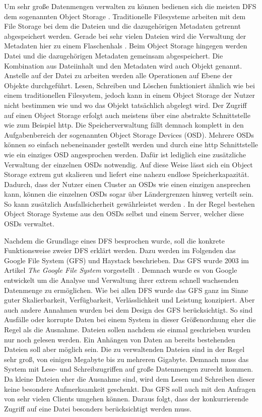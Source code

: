 \documentclass[12pt,oneside,a4paper,parskip]{scrbook}
\begin{document}
Um sehr große Datenmengen verwalten zu können bedienen sich die meisten DFS dem sogenannten Object Storage \cite{cephPaper}. Traditionelle Filesysteme arbeiten mit dem File Storage bei dem die Dateien und die dazugehörigen Metadaten getrennt abgespeichert werden. Gerade bei sehr vielen Dateien wird die Verwaltung der Metadaten hier zu einem Flaschenhals \cite{filestorage}. Beim Object Storage hingegen werden Datei und die dazugehörigen Metadaten gemeinsam abgespeichert. Die Kombination aus Dateiinhalt und den Metadaten wird auch Objekt genannt. Anstelle auf der Datei zu arbeiten werden alle Operationen auf Ebene der Objekte durchgeführt. Lesen, Schreiben und Löschen funktioniert ähnlich wie bei einem traditionellen Filesystem, jedoch kann in einem Object Storage der Nutzer nicht bestimmen wie und wo das Objekt tatsächlich abgelegt wird. Der Zugriff auf einen Object Storage erfolgt auch meistens über eine abstrakte Schnittstelle wie zum Beispiel http. Die Speicherverwaltung fällt demnach komplett in den Aufgabenbereich der sogenannten Object Storage Devices (OSD). Mehrere OSDs können so einfach nebeneinander gestellt werden und durch eine http Schnittstelle wie ein einziges OSD angesprochen werden. Dafür ist lediglich eine zusätzliche Verwaltung der einzelnen OSDs notwendig. Auf diese Weise lässt sich ein Object Storage extrem gut skalieren und liefert eine nahezu endlose Speicherkapazität. Dadurch, dass der Nutzer einen Cluster an OSDs wie einen einzigen ansprechen kann, können die einzelnen OSDs sogar über Ländergrenzen hinweg verteilt sein. So kann zusätzlich Ausfallsicherheit gewährleistet werden \cite{osvideo}\cite{objectstorage}. In der Regel bestehen Object Storage Systeme aus den OSDs selbst und einem Server, welcher diese OSDs verwaltet.

Nachdem die Grundlage eines DFS besprochen wurde, soll die konkrete Funktionsweise zweier DFS erklärt werden. Dazu werden im Folgenden das Google File System (GFS) und Haystack beschrieben.
Das GFS wurde 2003 im Artikel \textit{The Google File System} vorgestellt \cite{GFS}. Demnach wurde es von Google entwickelt um die Analyse und Verwaltung ihrer extrem schnell wachsenden Datenmenge zu ermöglichen. Wie bei allen DFS wurde das GFS ganz im Sinne guter Skalierbarkeit, Verfügbarkeit, Verlässlichkeit und Leistung konzipiert. Aber auch andere Annahmen wurden bei dem Design des GFS berücksichtigt. So sind Ausfälle oder korrupte Daten bei einem System in dieser Größenordnung eher die Regel als die Ausnahme. Dateien sollen nachdem sie einmal geschrieben wurden nur noch gelesen werden. Ein Anhängen von Daten an bereits bestehenden Dateien soll aber möglich sein. Die zu verwaltenden Dateien sind in der Regel sehr groß, von einigen Megabyte bis zu mehreren Gigabyte. Demnach muss das System mit Lese- und Schreibzugriffen auf große Datenmengen zurecht kommen. Da kleine Dateien eher die Ausnahme sind, wird dem Lesen und Schreiben dieser keine besondere Aufmerksamkeit geschenkt. Das GFS soll auch mit den Anfragen von sehr vielen Clients umgehen können. Daraus folgt, dass der konkurrierende Zugriff auf eine Datei besonders berücksichtigt werden muss.  
\end{document}
